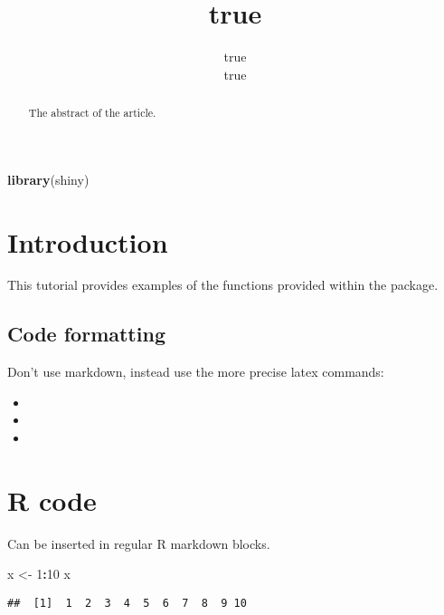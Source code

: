 \documentclass[]{article}
\title{true}
\author{true \\ true}
\date{}
\newenvironment{Shaded}{\begin{snugshade}}{\end{snugshade}}
\newcommand{\DecValTok}[1]{\textcolor[rgb]{0.00,0.00,0.81}{#1}}
\newcommand{\KeywordTok}[1]{\textcolor[rgb]{0.13,0.29,0.53}{\textbf{#1}}}
\newcommand{\NormalTok}[1]{#1}
\newcommand{\OperatorTok}[1]{\textcolor[rgb]{0.81,0.36,0.00}{\textbf{#1}}}
\newcommand{\StringTok}[1]{\textcolor[rgb]{0.31,0.60,0.02}{#1}}
\begin{document}
\maketitle
\begin{abstract}
The abstract of the article.
\end{abstract}

\begin{Shaded}
\begin{Highlighting}[]
\KeywordTok{library}\NormalTok{(shiny)}
\end{Highlighting}
\end{Shaded}

\hypertarget{introduction}{%
\section{Introduction}\label{introduction}}

This tutorial provides examples of the functions provided within the
 package.

\hypertarget{code-formatting}{%
\subsection{Code formatting}\label{code-formatting}}

Don't use markdown, instead use the more precise latex commands:

\begin{itemize}
\item
\item
\item
\end{itemize}

\hypertarget{r-code}{%
\section{R code}\label{r-code}}

Can be inserted in regular R markdown blocks.

\begin{Shaded}
\begin{Highlighting}[]
\NormalTok{x <-}\StringTok{ }\DecValTok{1}\OperatorTok{:}\DecValTok{10}
\NormalTok{x}
\end{Highlighting}
\end{Shaded}

\begin{verbatim}
##  [1]  1  2  3  4  5  6  7  8  9 10
\end{verbatim}
\end{document}
